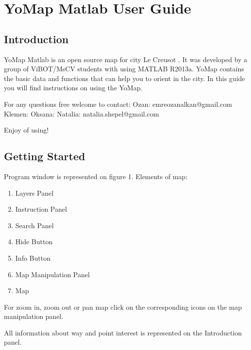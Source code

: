 
\chapter{YoMap Matlab User Guide} %

\label{Chapter10} %



\section{Introduction}
	YoMap Matlab is an open source map for city Le Creusot . It was developed by a group of ViBOT/MsCV students with using MATLAB R2013a. YoMap contains the basic data and functions that can help you to orient in the city. In this guide you will find instructions on using the YoMap.
	
For any questions free welcome to contact:
Ozan: emreozanalkan@gmail.com
Klemen: 
Oksana:
Natalia: natalia.shepel@gmail.com
\begin{center}
Enjoy of using!
\end{center}

	
\section{Getting Started}
	Program window is represented on figure 1. Elements of map:
	\begin{enumerate}
		\item Layers Panel
		\item Instruction Panel
		\item Search Panel
		\item Hide Button
		\item Info Button
		\item Map Manipulation Panel
		\item Map
	\end{enumerate}
	
	For zoom in, zoom out or pan map click on the corresponding icons on the map manipulation panel. 
	
	All information about way and point interest is represented on the Introduction panel. 
	
